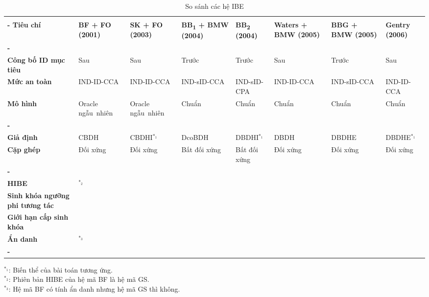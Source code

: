 \baselineskip
\small
\begin{longtabu}{| >{\bfseries\centering}p{2cm} X[c] X[c] X[c] X[c] X[c] X[c] X[c] |}
	\captionsetup{font=normalsize}
	\caption{So sánh các hệ IBE} \\
	\tabucline[4pt]-
	\everyrow{\tabucline[1pt]-}
	Tiêu chí &
	\bfseries BF 					\newline + FO 	\newline (2001) &
	\bfseries SK 					\newline + FO 	\newline (2003) &
	\bfseries BB\textsubscript{1} 	\newline + BMW 	\newline (2004) &
	\bfseries BB\textsubscript{2} 	\newline		\newline (2004) &
	\bfseries Waters 				\newline + BMW 	\newline (2005) &
	\bfseries BBG 					\newline + BMW 	\newline (2005) &
	\bfseries Gentry 				\newline		\newline (2006) \\
	\tabucline[1pt]-
	 \\
	Công bố ID mục tiêu 	& Sau 					& Sau 					& Trước 			& Trước 			& Sau 			& Trước 		& Sau 			\\
	Mức an toàn 			& IND-ID-CCA 			& IND-ID-CCA 			& IND-sID-CCA 		& IND-sID-CPA 		& IND-ID-CCA 	& IND-sID-CCA 	& IND-ID-CCA 		\\
	Mô hình 				& Oracle ngẫu~nhiên 	& Oracle ngẫu~nhiên 	& Chuẩn 			& Chuẩn 			& Chuẩn 		& Chuẩn 		& Chuẩn 			\\
	\tabucline[1pt]-
	 \\
	Giả định 				& CBDH 					& CBDHI$^{*_1}$ 		& DcoBDH 			& DBDHI$^{*_1}$ 	& DBDH 			& DBDHE 		& DBDHE$^{*_1}$ 	\\
	Cặp ghép				& Đối xứng 				& Đối xứng 				& Bất đối xứng 		& Bất đối xứng 		& Đối xứng 		& Đối xứng 		& Đối xứng 		\\
	\tabucline[1pt]-
	 \\
	HIBE 							& \checkmark$^{*_2}$ 	& & \checkmark 	& & \checkmark 	& \checkmark 	& 				\\
	Sinh khóa ngưỡng phi tương tác 	& \checkmark 			& & \checkmark 	& & \checkmark 	& \checkmark 	& 				\\
	Giới hạn cấp sinh khóa 			& 						& & 			& & 			& \checkmark 	& 				\\
	Ẩn danh 						& \checkmark$^{*_3}$ 	& & 			& & 			& 				& \checkmark 	\\
	\tabucline[2pt]-
\end{longtabu}
\vspace{-\baselineskip}
$^{*_1}$: Biến thể của bài toán tương ứng. \\
\indent $^{*_2}$: Phiên bản HIBE của hệ mã BF là hệ mã GS. \\
\indent $^{*_3}$: Hệ mã BF có tính ẩn danh nhưng hệ mã GS thì không.
\normalsize